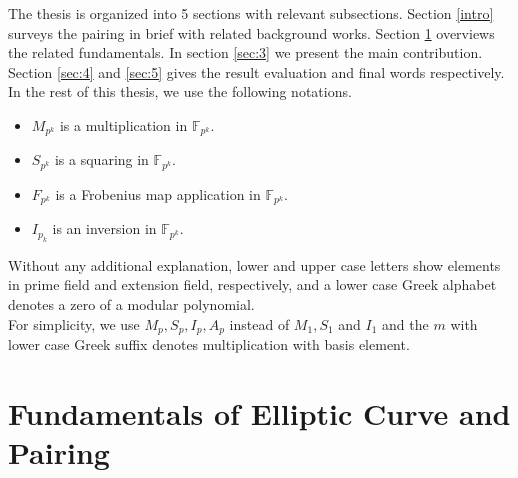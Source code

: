 The thesis is organized into 5 sections with relevant subsections.
Section \ref{intro} surveys the pairing in brief with related background works.
Section \ref{sec:1} overviews the related fundamentals.
In section \ref{sec:3} we present the main contribution.
Section \ref{sec:4} and \ref{sec:5} gives the result evaluation and final words respectively. \\
In the rest of this thesis, we use the following notations.
 \begin{itemize}
   \item $M_{p^k}$ is a multiplication in  $\mathbb{F}_{p^{k}}$.
   \item $S_{p^k}$ is a squaring in  $\mathbb{F}_{p^{k}}$.
   \item $F_{p^k}$ is a Frobenius map application in  $\mathbb{F}_{p^{k}}$.
   \item $I_{p_k}$ is an inversion in  $\mathbb{F}_{p^{k}}$.
\end{itemize}
Without any additional explanation, lower and upper case letters show elements in prime field and extension field, respectively, and a lower case Greek alphabet denotes a zero of a modular polynomial.\\
For simplicity, we use $M_p, S_p, I_p, A_p$ instead of $M_1, S_1$ and $I_1$ and 
the $m$ with lower case Greek suffix denotes multiplication with basis element.



\section{Fundamentals of Elliptic Curve and Pairing}\label{sec:1}
